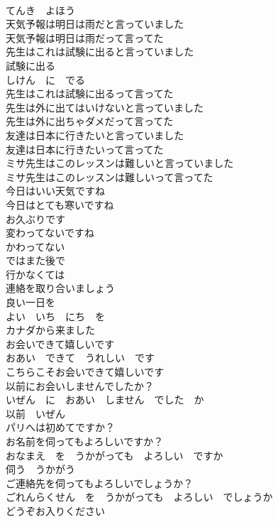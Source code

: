 \documentclass[8pt]{extreport}
\begin{document}
\begin{CJK}{UTF8}{min}
\\	てんき　よほう
\\	天気予報は明日は雨だと言っていました	
\\	天気予報は明日は雨だって言ってた	
\\	先生はこれは試験に出ると言っていました	
\\	試験に出る 
\\	しけん　に　でる
\\	先生はこれは試験に出るって言ってた	
\\	先生は外に出てはいけないと言っていました	
\\	先生は外に出ちゃダメだって言ってた	
\\	友達は日本に行きたいと言っていました	
\\	友達は日本に行きたいって言ってた	
\\	ミサ先生はこのレッスンは難しいと言っていました	
\\	ミサ先生はこのレッスンは難しいって言ってた	
\\	今日はいい天気ですね	
\\	今日はとても寒いですね	
\\	お久ぶりです	
\\	変わってないですね	
\\	かわってない
\\	ではまた後で	
\\	行かなくては	
\\	連絡を取り合いましょう	
\\	良い一日を	
\\	よい　いち　にち　を
\\	カナダから来ました	
\\	お会いできて嬉しいです	
\\	おあい　できて　うれしい　です	
\\	こちらこそお会いできて嬉しいです	
\\	以前にお会いしませんでしたか？	
\\	いぜん　に　おあい　しません　でした　か
\\	以前　いぜん 
\\	パリへは初めてですか？	
\\	お名前を伺ってもよろしいですか？	
\\	おなまえ　を　うかがっても　よろしい　ですか
\\	伺う　うかがう　
\\	ご連絡先を伺ってもよろしいでしょうか？	
\\	ごれんらくせん　を　うかがっても　よろしい　でしょうか
\\	どうぞお入りください	

\end{CJK}
\end{document}
